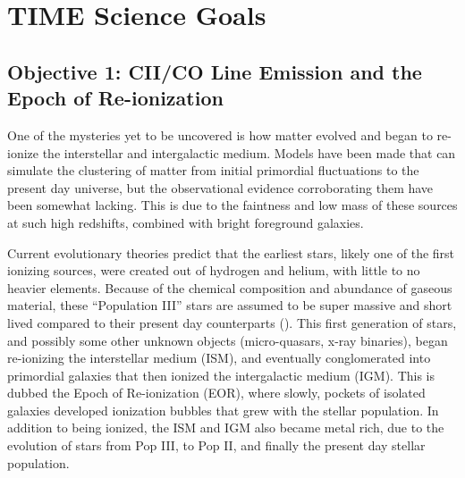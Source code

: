 \documentclass[manuscript]{aastex}
\begin{document}
\section{TIME Science Goals}
\subsection{Objective 1: CII/CO Line Emission and the Epoch of Re-ionization}

One of the mysteries yet to be uncovered is how matter evolved and began to re-ionize the interstellar and intergalactic medium. Models have been made that can simulate the clustering of matter from initial primordial fluctuations to the present day universe, but the observational evidence corroborating them have been somewhat lacking. This is due to the faintness and low mass of these sources at such high redshifts, combined with bright foreground galaxies. 

Current evolutionary theories predict that the earliest stars, likely one of the first ionizing sources, were created out of hydrogen and helium, with little to no heavier elements. Because of the chemical composition and abundance of gaseous material, these ``Population III'' stars are assumed to be super massive and short lived compared to their present day counterparts (\cite{Zaroubi2012}). This first generation of stars, and possibly some other unknown objects (micro-quasars, x-ray binaries), began re-ionizing the interstellar medium (ISM), and eventually conglomerated into primordial galaxies that then ionized the intergalactic medium (IGM). This is dubbed the Epoch of Re-ionization (EOR), where slowly, pockets of isolated galaxies developed ionization bubbles that grew with the stellar population. In addition to being ionized, the ISM and IGM also became metal rich, due to the evolution of stars from Pop III, to Pop II, and finally the present day stellar population. 
\end{document}
